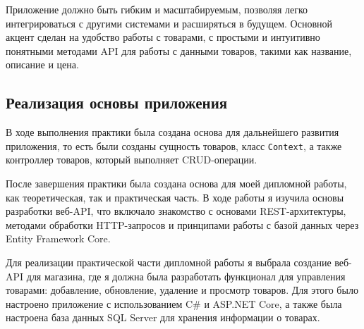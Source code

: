 \documentclass[a4paper,12pt]{report}
\begin{document}
Приложение должно быть гибким и масштабируемым, позволяя легко интегрироваться с другими системами и расширяться в будущем. 
Основной акцент сделан на удобство работы с товарами, с простыми и интуитивно понятными методами \acs{API} для работы с данными товаров, 
такими как название, описание и цена.

\subsection{Реализация основы приложения}

В ходе выполнения практики была создана основа для дальнейшего развития приложения, то есть были созданы сущность товаров, класс \texttt{Context}, 
а также контроллер товаров, который выполняет \acs{CRUD}-операции.


После завершения практики была создана основа для моей дипломной работы, как теоретическая, так и практическая часть. 
В ходе работы я изучила основы разработки веб-\acs{API}, что включало знакомство с основами \acs{REST}-архитектуры, методами обработки 
\acs{HTTP}-запросов и принципами работы с базой данных через Entity Framework Core.

Для реализации практической части дипломной работы я выбрала создание веб-\acs{API} для магазина, где я должна была разработать 
функционал для управления товарами: добавление, обновление, удаление и просмотр товаров. Для этого было настроено приложение 
с использованием C\# и ASP.NET Core, а также была настроена база данных \acs{SQL} Server для хранения информации о товарах.

\newpage
{}
\end{document}
